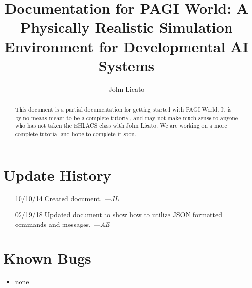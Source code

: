 \documentclass[11pt]{article}
\begin{document}
\title{Documentation for PAGI World: A Physically Realistic Simulation Environment for Developmental AI Systems}
\author{John Licato}
\maketitle

\begin{abstract}
This document is a partial documentation for getting started with PAGI World. It is by no means meant to be a complete tutorial, and may not make much sense to anyone who has not taken the EHLACS class with John Licato. We are working on a more complete tutorial and hope to complete it soon.
\end{abstract}

\tableofcontents

\section*{Update History}

\begin{itemize}
\item[10/10/14] Created document. \textit{---JL}
\item[02/19/18] Updated document to show how to utilize JSON formatted commands and messages. \textit{---AE}
\end{itemize}

\section*{Known Bugs}

\begin{itemize}
\item none
\end{itemize}

\pagebreak
\end{document}
